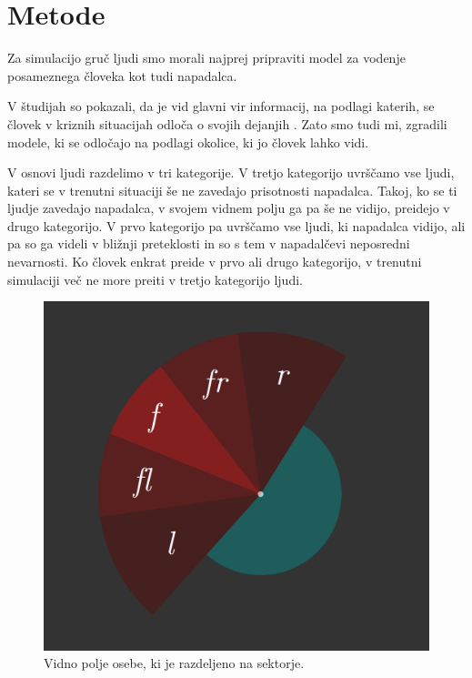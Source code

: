 \documentclass[9pt]{pnas-new}
\begin{document}
\section*{Metode}
Za simulacijo gruč ljudi smo morali najprej pripraviti model za vodenje posameznega človeka kot tudi napadalca.

V študijah so pokazali, da je vid glavni vir informacij, na podlagi katerih, se človek v kriznih situacijah odloča o svojih dejanjih \cite{brcdp2018, mht2011}. Zato smo tudi mi, zgradili modele, ki se odločajo na podlagi okolice, ki jo človek lahko vidi.

V osnovi ljudi razdelimo v tri kategorije. V tretjo kategorijo uvrščamo vse ljudi, kateri se v trenutni situaciji še ne zavedajo prisotnosti napadalca. Takoj, ko se ti ljudje zavedajo napadalca, v svojem vidnem polju ga pa še ne vidijo, preidejo v drugo kategorijo. V prvo kategorijo pa uvrščamo vse ljudi, ki napadalca vidijo, ali pa so ga videli v bližnji preteklosti in so s tem v napadalčevi neposredni nevarnosti. Ko človek enkrat preide v prvo ali drugo kategorijo, v trenutni simulaciji več ne more preiti v tretjo kategorijo ljudi.

\begin{figure}
	\centering
	\includegraphics[scale=0.3]{fig/vision_field.PNG}
	\caption{Vidno polje osebe, ki je razdeljeno na sektorje.}
	\label{fig:vision_field}
\end{figure}
\end{document}
